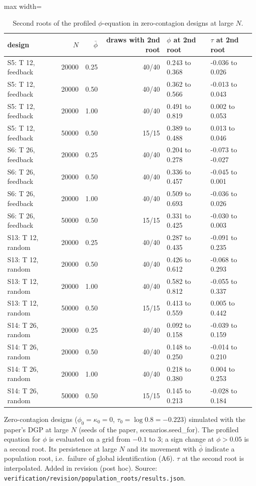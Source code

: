 \begin{table}[!t]
\centering
\caption{Second roots of the profiled $\phi$-equation in zero-contagion designs at large $N$.}
\label{tab:rev-poproots}
\footnotesize
\setlength{\tabcolsep}{3.5pt}
\begin{adjustbox}{max width=\linewidth}
\begin{tabular}{lrrrll}
\toprule
design & $N$ & $\bar\phi$ & draws with 2nd root & $\phi$ at 2nd root & $\tau$ at 2nd root \\
\midrule
S5: T 12, feedback & 20000 & 0.25 & 40/40 & 0.243 to 0.368 & -0.036 to 0.026 \\
S5: T 12, feedback & 20000 & 0.50 & 40/40 & 0.362 to 0.566 & -0.013 to 0.043 \\
S5: T 12, feedback & 20000 & 1.00 & 40/40 & 0.491 to 0.819 & 0.002 to 0.053 \\
S5: T 12, feedback & 50000 & 0.50 & 15/15 & 0.389 to 0.488 & 0.013 to 0.046 \\
S6: T 26, feedback & 20000 & 0.25 & 40/40 & 0.204 to 0.278 & -0.073 to -0.027 \\
S6: T 26, feedback & 20000 & 0.50 & 40/40 & 0.336 to 0.457 & -0.045 to 0.001 \\
S6: T 26, feedback & 20000 & 1.00 & 40/40 & 0.509 to 0.693 & -0.036 to 0.026 \\
S6: T 26, feedback & 50000 & 0.50 & 15/15 & 0.331 to 0.425 & -0.030 to 0.003 \\
S13: T 12, random & 20000 & 0.25 & 40/40 & 0.287 to 0.435 & -0.091 to 0.235 \\
S13: T 12, random & 20000 & 0.50 & 40/40 & 0.426 to 0.612 & -0.068 to 0.293 \\
S13: T 12, random & 20000 & 1.00 & 40/40 & 0.582 to 0.812 & -0.055 to 0.337 \\
S13: T 12, random & 50000 & 0.50 & 15/15 & 0.413 to 0.559 & 0.005 to 0.442 \\
S14: T 26, random & 20000 & 0.25 & 40/40 & 0.092 to 0.158 & -0.039 to 0.159 \\
S14: T 26, random & 20000 & 0.50 & 40/40 & 0.148 to 0.250 & -0.014 to 0.210 \\
S14: T 26, random & 20000 & 1.00 & 40/40 & 0.218 to 0.380 & 0.004 to 0.253 \\
S14: T 26, random & 50000 & 0.50 & 15/15 & 0.145 to 0.213 & -0.028 to 0.184 \\
\bottomrule
\end{tabular}
\end{adjustbox}
\par\smallskip\parbox{\linewidth}{\scriptsize Zero-contagion designs ($\phi_0=\kappa_0=0$, $\tau_0=\log 0.8=-0.223$) simulated with the paper's DGP at large $N$ (seeds of the paper, scenarios.seed\_for). The profiled equation for $\phi$ is evaluated on a grid from $-0.1$ to 3; a sign change at $\phi>0.05$ is a second root. Its persistence at large $N$ and its movement with $\bar\phi$ indicate a population root, i.e.\ failure of global identification (A6). $\hat\tau$ at the second root is interpolated. Added in revision (post hoc). Source: \texttt{verification/revision/population\_roots/results.json}.}
\end{table}
